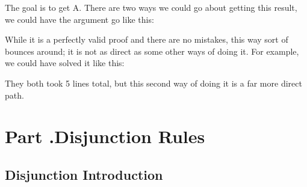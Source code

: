 The goal is to get \enot A. There are two ways we could go about getting this result, we could have the argument go like this:

\begin{fitchproof}
            
            
\end{fitchproof}

While it is a perfectly valid proof and there are no mistakes, this way sort of bounces around; it is not as direct as some other ways of doing it. For example, we could have solved it like this:

\begin{fitchproof}
            
            
\end{fitchproof}

They both took 5 lines total, but this second way of doing it is a far more direct path.
\section{Part \thechapcount.\theseccount Disjunction Rules}
\subsection{Disjunction Introduction}

